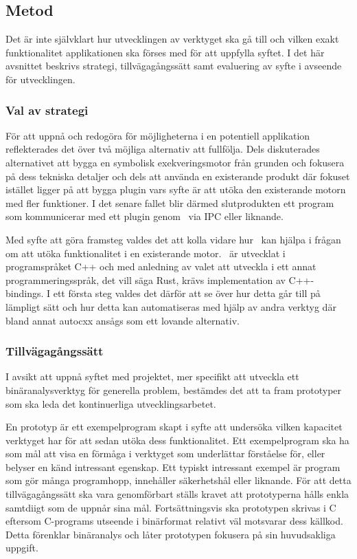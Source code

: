 \subsection{Metod}

Det är inte självklart hur utvecklingen av verktyget ska gå till och vilken 
exakt funktionalitet applikationen ska förses med för att uppfylla syftet. I det här
avsnittet beskrivs strategi, tillvägagångssätt samt evaluering av syfte i
avseende för utvecklingen.

\subsubsection{Val av strategi}

För att uppnå och redogöra för möjligheterna i en potentiell applikation
reflekterades det över två möjliga alternativ att fullfölja. Dels diskuterades
alternativet att bygga en symbolisk exekveringsmotor från grunden och fokusera
på dess tekniska detaljer och dels att använda en existerande produkt där
fokuset istället ligger på att bygga plugin vars syfte är att utöka den
existerande motorn med fler funktioner. I det senare fallet blir därmed
slutprodukten ett program som kommunicerar med ett plugin genom \stoe\ via IPC
eller liknande. 

Med syfte att göra framsteg valdes det att kolla vidare hur \stoe\ kan hjälpa i
frågan om att utöka funktionalitet i en existerande motor. \stoe\ är utvecklat
i programspråket C++ och med anledning av valet att utveckla i ett
annat programmeringsspråk, det vill säga Rust, krävs implementation av
C++-bindings. I ett första steg valdes det därför att se över hur detta går till
på lämpligt sätt och hur detta kan automatiseras med hjälp av andra verktyg
där bland annat autocxx ansågs som ett lovande alternativ.

\subsubsection{Tillvägagångssätt}

I avsikt att uppnå syftet med projektet, mer specifikt att utveckla ett
binäranalysverktyg för generella problem, bestämdes det att ta fram prototyper som ska leda det
kontinuerliga utvecklingsarbetet.

En prototyp är ett exempelprogram skapt i syfte att undersöka vilken
kapacitet verktyget har för att sedan utöka dess funktionalitet. Ett
exempelprogram ska ha som mål att visa en förmåga i verktyget som underlättar
förståelse för, eller belyser en känd intressant egenskap. Ett typiskt
intressant exempel är program som gör många programhopp, innehåller säkerhetshål
eller liknande. För att detta tillvägagångssätt ska vara genomförbart ställs
kravet att prototyperna hålls enkla samtdiigt som de uppnår sina mål.
Fortsättningsvis ska prototypen skrivas i C eftersom C-programs utseende i
binärformat relativt väl motsvarar dess källkod. Detta förenklar binäranalys och
låter prototypen fokusera på sin huvudsakliga uppgift. 

